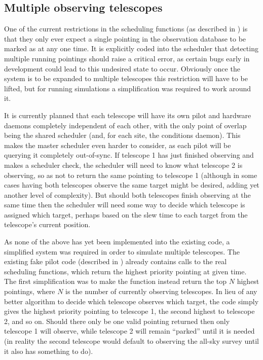 \subsection{Multiple observing telescopes}
\label{sec:multi_tel_scheduling}
\begin{colsection}

One of the current restrictions in the scheduling functions (as described in ) is that they only ever expect a single pointing in the observation database to be marked as  at any one time. It is explicitly coded into the scheduler that detecting multiple running pointings should raise a critical error, as certain bugs early in development could lead to this undesired state to occur. Obviously once the system is to be expanded to multiple telescopes this restriction will have to be lifted, but for running simulations a simplification was required to work around it.

It is currently planned that each telescope will have its own pilot and hardware daemons completely independent of each other, with the only point of overlap being the shared scheduler (and, for each site, the conditions daemon). This makes the master scheduler even harder to consider, as each pilot will be querying it completely out-of-sync. If telescope 1 has just finished observing and makes a scheduler check, the scheduler will need to know what telescope 2 is observing, so as not to return the same pointing to telescope 1 (although in some cases having both telescopes observe the same target might be desired, adding yet another level of complexity). But should both telescopes finish observing at the same time then the scheduler will need some way to decide which telescope is assigned which target, perhaps based on the slew time to each target from the telescope's current position.

As none of the above has yet been implemented into the existing code, a simplified system was required in order to simulate multiple telescopes. The existing fake pilot code (described in ) already contains calls to the real scheduling functions, which return the highest priority pointing at given time. The first simplification was to make the function instead return the top $N$ highest pointings, where $N$ is the number of currently observing telescopes. In lieu of any better algorithm to decide which telescope observes which target, the code simply gives the highest priority pointing to telescope 1, the second highest to telescope 2, and so on. Should there only be one valid pointing returned then only telescope 1 will observe, while telescope 2 will remain ``parked'' until it is needed (in reality the second telescope would default to observing the all-sky survey until it also has something to do).


\end{colsection}
